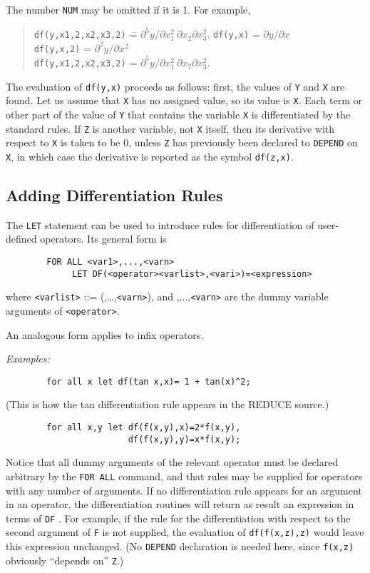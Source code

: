 \documentclass[11pt,letterpaper]{book}
\makeatletter
\newcommand{\REDUCE}{REDUCE}
\newcommand{\underscore}{\_}
\newcommand{\ttindex}[1]{{\renewcommand{\_}{\protect\underscore}%
                          \index{#1@{\tt #1}}}}
\makeatother
\begin{document}
The number {\tt NUM} may be omitted if it is 1.  For example,
\begin{quote}
\begin{tabbing}
{\tt            df(y,x1,2,x2,x3,2)} \= = $\partial^{5}y/\partial x_{1}^{2} \
 \partial x_{2}\partial x_{3}^{2}.$\kill
{\tt            df(y,x)} \> = $\partial y/\partial x$ \\
{\tt            df(y,x,2)} \> = $\partial^{2}y/\partial x^{2}$ \\
{\tt            df(y,x1,2,x2,x3,2)} \> = $\partial^{5}y/\partial x_{1}^{2} \
 \partial x_{2}\partial x_{3}^{2}.$
\end{tabbing}
\end{quote}
The evaluation of {\tt df(y,x)} proceeds as follows: first, the values of
{\tt Y} and {\tt X} are found.  Let us assume that {\tt X} has no assigned
value, so its value is {\tt X}.  Each term or other part of the value of
{\tt Y} that contains the variable {\tt X} is differentiated by the
standard rules.  If {\tt Z} is another variable, not {\tt X} itself, then
its derivative with respect to {\tt X} is taken to be 0, unless {\tt Z}
has previously been declared to {\tt DEPEND} on {\tt X}, in which
case the derivative is reported as the symbol {\tt df(z,x)}.


\subsection{Adding Differentiation Rules}

The {\tt LET}\ttindex{LET} statement can be used to introduce
rules for differentiation of user-defined operators.  Its general form is
{\small\begin{verbatim}
        FOR ALL <var1>,...,<varn>
             LET DF(<operator><varlist>,<vari>)=<expression>
\end{verbatim}}
where {\tt <varlist>} ::= ({\tt <var1>},\dots,{\tt <varn>}), and
{\tt <var1>},...,{\tt <varn>} are the dummy variable arguments of
{\tt <operator>}.

An analogous form applies to infix operators.

{\it Examples:}
{\small\begin{verbatim}
        for all x let df(tan x,x)= 1 + tan(x)^2;
\end{verbatim}}
(This is how the tan differentiation rule appears in the {\REDUCE}
source.)
{\small\begin{verbatim}
        for all x,y let df(f(x,y),x)=2*f(x,y),
                        df(f(x,y),y)=x*f(x,y);
\end{verbatim}}
Notice that all dummy arguments of the relevant operator must be declared
arbitrary by the {\tt FOR ALL} command, and that rules may be supplied for
operators with any number of arguments.  If no differentiation rule
appears for an argument in an operator, the differentiation routines will
return as result an expression in terms of {\tt DF}\ttindex{DF}.  For
example, if the rule for the differentiation with respect to the second
argument of {\tt F} is not supplied, the evaluation of {\tt df(f(x,z),z)}
would leave this expression unchanged. (No {\tt DEPEND} declaration
is needed here, since {\tt f(x,z)} obviously ``depends on'' {\tt Z}.)
\end{document}
